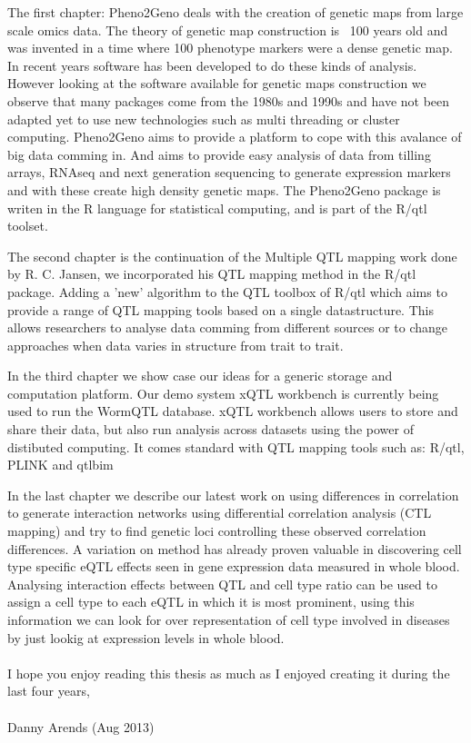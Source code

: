 The first chapter: Pheno2Geno deals with the creation of genetic maps from large scale omics data. 
The theory of genetic map construction is ~100 years old and was invented in a time where 100 
phenotype markers were a dense genetic map. In recent years software has been developed to do these 
kinds of analysis. However looking at the software available for genetic maps construction we 
observe that many packages come from the 1980s and 1990s and have not been adapted yet to use new 
technologies such as multi threading or cluster computing. Pheno2Geno aims to provide a platform to 
cope with this avalance of big data comming in. And aims to provide easy analysis of data from 
tilling arrays, RNAseq and next generation sequencing to generate expression markers and with these 
create high density genetic maps. The Pheno2Geno package is writen in the R language for statistical 
computing, and is part of the R/qtl toolset.

The second chapter is the continuation of the Multiple QTL mapping work done by R. C. Jansen, we 
incorporated his QTL mapping method in the R/qtl package. Adding a 'new' algorithm to the QTL 
toolbox of R/qtl which aims to provide a range of QTL mapping tools based on a single datastructure. 
This allows researchers to analyse data comming from different sources or to change approaches when 
data varies in structure from trait to trait.

In the third chapter we show case our ideas for a generic storage and computation platform. Our demo 
system xQTL workbench is currently being used to run the WormQTL database. xQTL workbench allows 
users to store and share their data, but also run analysis across datasets using the power of 
distibuted computing. It comes standard with  QTL mapping tools such as: R/qtl, PLINK and qtlbim

In the last chapter we describe our latest work on using differences in correlation to generate 
interaction networks using differential correlation analysis (CTL mapping) and try to find genetic 
loci controlling these observed correlation differences. A variation on method has already proven 
valuable in discovering cell type specific eQTL effects seen in gene expression data measured in 
whole blood. Analysing interaction effects between QTL and cell type ratio can be used to assign a 
cell type to each eQTL in which it is most prominent, using this information we can look for over 
representation of cell type involved in diseases by just lookig at expression levels in whole blood.\\\\

I hope you enjoy reading this thesis as much as I enjoyed creating it during the last four years,\\\\
Danny Arends (Aug 2013)
